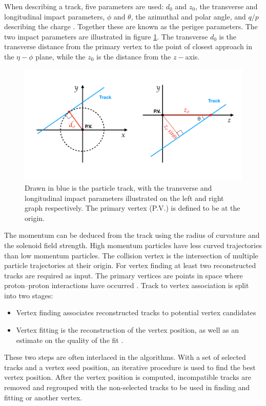 When describing a track, five parameters are used: $d_0$ and $z_0$, the transverse and longitudinal impact parameters, $\phi$ and $\theta$, the azimuthal and polar angle, and $q/p$ describing the charge \cite{}. Together these are known as the perigee parameters. The two impact parameters are illustrated in figure \ref{fig:impactparameters}. The transverse $d_0$ is the transverse distance from the primary vertex to the point of closest approach in the $\eta-\phi$ plane, while the $z_0$ is the distance  from the $z-$axis. 
\begin{figure}
    \centering
    \includegraphics[width=\textwidth]{Figures/LHC/impact_params.pdf}
    \caption{Drawn in blue is the particle track, with the transverse and longitudinal impact parameters illustrated on the left and right graph respectively. The primary vertex (P.V.) is defined to be at the origin.}
    \label{fig:impactparameters}
\end{figure}
The momentum can be deduced from the track using the radius of curvature and the solenoid field strength. High momentum particles have less curved trajectories than low momentum particles. The collision vertex is the intersection of multiple particle trajectories at their origin. For vertex finding at least two reconstructed tracks are required as input. The primary vertices are points in space where proton–proton interactions have occurred \cite{ATLAS_primary_vertices}. Track to vertex association is split into two stages: 
\begin{itemize}
    \item Vertex finding associates reconstructed tracks to potential vertex candidates
    \item Vertex fitting is the reconstruction of the vertex position, as well as an estimate on the quality of the fit \cite{Piacquadio_2008}.
\end{itemize}
These two steps are often interlaced in the algorithms. With a set of selected tracks and a vertex seed position, an iterative procedure is used to find the best vertex position. After the vertex position is computed, incompatible tracks are removed and regrouped with the non-selected tracks to be used in finding and fitting or another vertex. 

